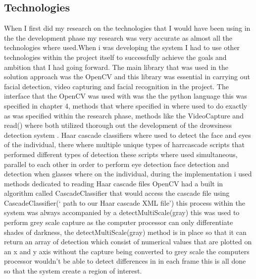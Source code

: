 \subsection{Technologies}
When I first did my research on the  technologies that I would have been using in the the development phase my research was very accurate as almost all the technologies where used.When i was developing the system I had to use other technologies within the project itself to successfully achieve the goals and ambition that I had going forward. The main library that was used in the solution approach was the OpenCV and this library was essential in carrying out facial detection, video capturing and facial recognition in the project. The interface that the OpenCV was used with was the the python language this was specified in chapter 4, methods that where specified in where used to do exactly as was specified within the research phase, methods like the VideoCapture and read() where both utilized thorough out the development of the drowsiness detection system .
 Haar cascade classifiers where used to detect the face and eyes of the individual, there where multiple unique types of harrcascade scripts that performed different types of detection these scripts where used simultaneous, parallel to each other in order to perform eye detection face detection and detection when glasses where on the individual, during the implementation i used methods dedicated to reading Haar cascade files OpenCV had a built in algorithm called CascadeClassifier that would access the cascade file using CascadeClassifier(‘ path to our Haar cascade XML file’)  this process within the system was always accompanied by a detectMultiScale(gray) this was used to perform grey scale capture as the computer processor can only differentiate  shades of darkness, the detectMultiScale(gray) method is in place so that it can return an array of detection which consist of numerical values that are plotted on an x and y axis without the capture being converted to grey scale the computers processor wouldn't be able to detect differences in in each frame this is all done so that the system create a region of interest.
 

